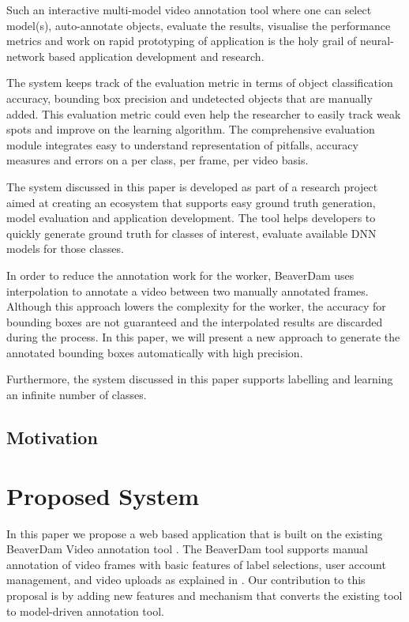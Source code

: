 \documentclass[conference]{IEEEtran}
\begin{document}
Such an interactive multi-model video annotation tool where one can select model(s), auto-annotate objects, evaluate the results, visualise the performance metrics and work on rapid prototyping of application is the holy grail of neural-network based application development and research.\par
The system keeps track of the evaluation metric in terms of object classification accuracy, bounding box precision and undetected objects that are manually added. This evaluation metric could even help the researcher to easily track weak spots and improve on the learning algorithm. The comprehensive evaluation module integrates easy to understand representation of pitfalls, accuracy measures and errors on a per class, per frame, per video basis. \par
The system discussed in this paper is developed as part of a research project aimed at creating an ecosystem that supports easy ground truth generation, model evaluation and application development. The tool helps developers to quickly generate ground truth for classes of interest, evaluate available DNN models for those classes. \par
In order to reduce the annotation work for the worker, BeaverDam uses interpolation to annotate a video between two manually annotated frames. Although this approach lowers the complexity for the worker, the accuracy for bounding boxes are not guaranteed and the interpolated results are discarded during the process. In this paper, we will present a new approach to generate the annotated bounding boxes automatically with high precision.\par
Furthermore, the system discussed in this paper supports labelling and learning an infinite number of classes.  \par

\subsection{Motivation}

\section{Proposed System}\label{sec.overview}
In this paper we propose a web based application that is built on the existing BeaverDam Video annotation tool \cite{dominguez2014gtgencv}.  
The BeaverDam tool supports manual annotation of video frames with basic features of label selections, user account management, and video uploads as explained in \cite{dominguez2014gtgencv}. 
Our contribution to this proposal is by adding new features and mechanism that converts the existing tool to model-driven annotation tool.
\end{document}
